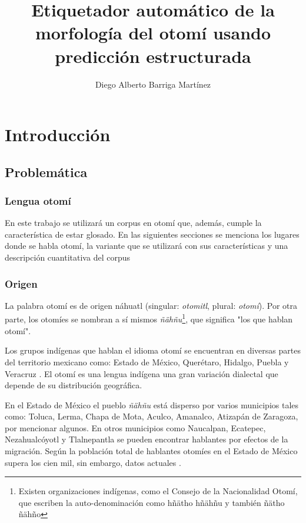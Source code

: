 \documentclass[letterpaper,12pt,oneside]{book}
\begin{document}

\author{Diego Alberto Barriga Martínez}
\title{Etiquetador automático de la morfología del otomí usando predicción estructurada}
\tableofcontents
\maketitle

\chapter{Introducción}

\section{Problemática}

\subsection{Lengua otomí}

En este trabajo se utilizará un corpus en otomí que, además, cumple la característica de estar glosado. En las siguientes secciones se menciona los lugares donde se habla otomí, la variante que se utilizará con sus características y una descripción cuantitativa del corpus

\subsection{Origen}

La palabra otomí es de origen náhuatl (singular: \textit{otomitl}, plural: \textit{otomí}). Por otra parte, los otomíes se nombran a sí mismos \textit{ñähñu}\footnote{Existen organizaciones indígenas, como el Consejo de la Nacionalidad Otomí, que escriben la auto-denominación como hñätho hñähñu y también ñätho ñähño}, que significa "los que hablan otomí".

Los grupos indígenas que hablan el idioma otomí se encuentran en diversas partes del territorio mexicano como: Estado de México, Querétaro, Hidalgo, Puebla y Veracruz \citep{barrientos2004otomies}. El otomí es una lengua indígena una gran variación dialectal que depende de su distribución geográfica.

En el Estado de México el pueblo \textit{ñähñu} está disperso por varios municipios tales como: Toluca, Lerma, Chapa de Mota, Aculco, Amanalco, Atizapán de Zaragoza, por mencionar algunos. En otros municipios como Naucalpan, Ecatepec, Nezahualcóyotl y Tlalnepantla se pueden encontrar hablantes por efectos de la migración. Según \citet{barrientos2004otomies} la población total de hablantes otomíes en el Estado de México supera los cien mil, sin embargo, datos actuales .
\end{document}
